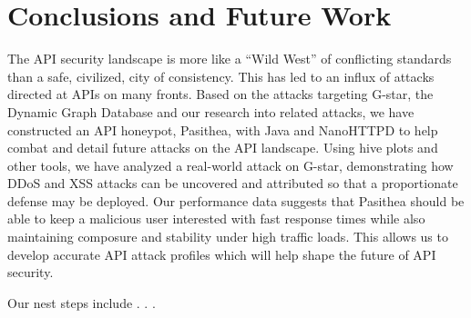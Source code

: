 
\section{Conclusions and Future Work} \label{conclusions}

The API security landscape is more like a ``Wild West'' of conflicting standards than a safe, civilized, city of consistency.
This has led to an influx of attacks directed at APIs on many  fronts. 
Based on the attacks targeting G-star, the Dynamic Graph Database and our research into related attacks, we have constructed an API honeypot, Pasithea, with Java and NanoHTTPD to help combat and detail future attacks on the API landscape. 
Using hive plots and other tools, we have analyzed a real-world attack on G-star, demonstrating how DDoS and XSS attacks can be uncovered and attributed so that a proportionate defense may be deployed.  
Our performance data suggests that Pasithea should be able to keep a malicious user interested with fast response times while also maintaining composure and stability under high traffic loads. 
This allows us to develop accurate API attack profiles which will help shape the future of API security.

Our nest steps include . . .